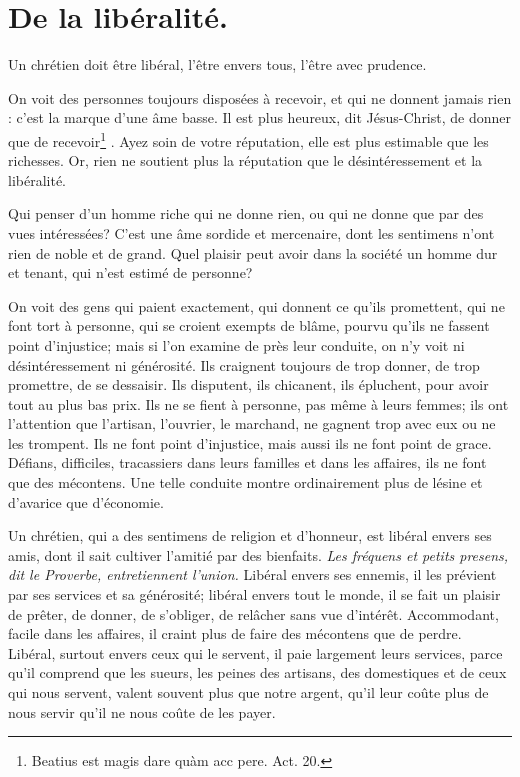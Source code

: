 \documentclass[instructions.tex]{subfiles}
\begin{document}
 
\chapter{De la libéralité.}
 
Un chrétien doit être libéral, l'être envers tous, l'être avec prudence.
 
\primo On voit des personnes toujours disposées à recevoir, et qui ne donnent jamais rien : c'est la marque d'une âme basse. Il est plus heureux, dit Jésus-Christ, de donner que de recevoir\footnote{Beatius est magis dare quàm acc pere. Act. 20.} . Ayez soin de votre réputation, elle est plus estimable que les richesses. Or, rien ne soutient plus la réputation que le désintéressement et la libéralité.
 
Qui penser d'un homme riche qui ne donne rien, ou qui ne donne que par des vues intéressées? C'est une âme sordide et mercenaire, dont les sentimens n'ont rien de noble et de grand. Quel plaisir peut avoir dans la société un homme dur et tenant, qui n'est estimé de personne?
 
On voit des gens qui paient exactement, qui donnent ce qu'ils promettent, qui ne font tort à personne, qui se croient exempts de blâme, pourvu qu'ils ne fassent point d'injustice; mais si l'on examine de près leur conduite, on n'y voit ni désintéressement ni générosité. Ils craignent toujours de trop donner, de trop promettre, de se dessaisir. Ils disputent, ils chicanent, ils épluchent, pour avoir tout au plus bas prix. Ils ne se fient à personne, pas même à leurs femmes; ils ont l'attention que l'artisan, l'ouvrier, le marchand, ne gagnent trop avec eux ou ne les trompent. Ils ne font point d'injustice, mais aussi ils ne font point de grace. Défians, difficiles, tracassiers dans leurs familles et dans les affaires, ils ne font que des mécontens. Une telle conduite montre ordinairement plus de lésine et d'avarice que d'économie.
 
\secundo Un chrétien, qui a des sentimens de religion et d'honneur, est libéral envers ses amis, dont il sait cultiver l'amitié par des bienfaits. \textit{Les fréquens et petits presens, dit le Proverbe, entretiennent l'union.} Libéral envers ses ennemis, il les prévient par ses services et sa générosité; libéral envers tout le monde, il se fait un plaisir de prêter, de donner, de s'obliger, de relâcher sans vue d'intérêt. Accommodant, facile dans les affaires, il craint plus de faire des mécontens que de perdre. Libéral, surtout envers ceux qui le servent, il paie largement leurs services, parce qu'il comprend que les sueurs, les peines des artisans, des domestiques et de ceux qui nous servent, valent souvent plus que notre argent, qu'il leur coûte plus de nous servir qu'il ne nous coûte de les payer.
 
\end{document}
